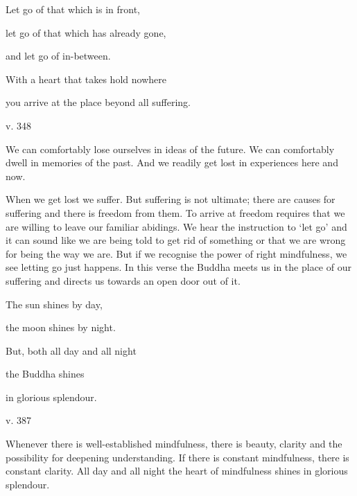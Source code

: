 \documentclass[a4paper,portrait,12pt]{article}
\begin{document}
Let go of that which is in front,


let go of that which has already gone,


and let go of in-between.


With a heart that takes hold nowhere


you arrive at the place beyond all suffering.





v. 348 





We can comfortably lose ourselves in ideas of the future. We can comfortably dwell in memories of the past. And we readily get lost in experiences here and now. 


When we get lost we suffer. But suffering is not ultimate; there are causes for suffering and there is freedom from them. To arrive at freedom requires that we are willing to leave our familiar abidings. We hear the instruction to `let go' and it can sound like we are being told to get rid of something or that we are wrong for being the way we are. But if we recognise the power of right mindfulness, we see letting go just happens. In this verse the Buddha meets us in the place of our suffering and directs us towards an open door out of it.














The sun shines by day,


the moon shines by night.


But, both all day and all night


the Buddha shines 


in glorious splendour.





v. 387





Whenever there is well-established mindfulness, there is beauty, clarity and the possibility for deepening understanding. If there is constant mindfulness, there is constant clarity. All day and all night the heart of mindfulness shines in glorious splendour.
\end{document}
